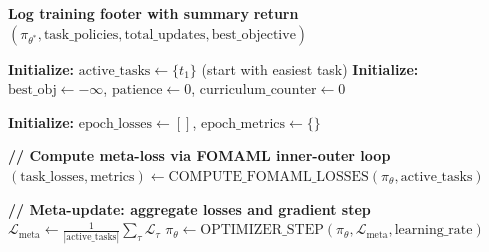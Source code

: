 \documentclass[11pt,a4paper]{article}
\begin{document}
\begin{algorithm}[h]
\begin{algorithmic}[1]
\State \textbf{Log training footer with summary}
\State \textbf{return} $(\pi_{\theta^*}, \text{task\_policies}, \text{total\_updates}, \text{best\_objective})$

\end{algorithmic}
\end{algorithm}

\clearpage


\begin{algorithm}[h]
\caption{PHASE\_META\_LEARN: FOMAML with Entropy-Based Curriculum}
\label{alg:phase1}
\begin{algorithmic}[1]



\State \textbf{Initialize:} $\text{active\_tasks} \leftarrow \{t_1\}$ (start with easiest task)
\State \textbf{Initialize:} $\text{best\_obj} \leftarrow -\infty$, $\text{patience} \leftarrow 0$, $\text{curriculum\_counter} \leftarrow 0$


	\State \textbf{Initialize:} $\text{epoch\_losses} \leftarrow []$, $\text{epoch\_metrics} \leftarrow \{\}$


		\State \textbf{// Compute meta-loss via FOMAML inner-outer loop}
		\State $(\text{task\_losses}, \text{metrics}) \leftarrow \text{COMPUTE\_FOMAML\_LOSSES}(\pi_\theta, \text{active\_tasks})$

		\State \textbf{// Meta-update: aggregate losses and gradient step}
		\State $\mathcal{L}_{\text{meta}} \leftarrow \frac{1}{|\text{active\_tasks}|} \sum_{\tau} \mathcal{L}_\tau$
		\State $\pi_\theta \leftarrow \text{OPTIMIZER\_STEP}(\pi_\theta, \mathcal{L}_{\text{meta}}, \text{learning\_rate})$


\end{algorithmic}
\end{algorithm}
\end{document}
